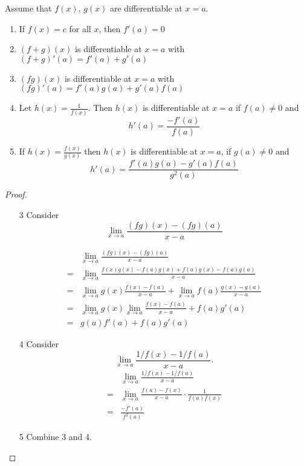 
\begin{thm}
Assume that $f(x)$, $g(x)$ are differentiable at $x=a$.
\begin{enumerate}
\item If $f(x) = c$ for all $x$, then $f'(a) = 0$
\item $(f+g)(x)$ is differentiable at $x=a$ with $(f+g)'(a) = f'(a) + g'(a)$
\item $(fg)(x)$ is differentiable at $x=a$ with $(fg)'(a) = f'(a)g(a) + g'(a)f(a)$
\item Let $h(x)= \frac{1}{f(x)}$. Then $h(x)$ is differentiable at $x = a$ if $f(a)\neq 0$ and \[h'(a) = \frac{-f'(a)}{f(a)}\]
\item If $h(x)=\frac{f(x)}{g(x)}$ then $h(x)$ is differentiable at $x=a$, if $g(a)\neq 0$ and \[h'(a) = \frac{f'(a)g(a)-g'(a)f(a)}{g^2(a)}\]
\end{enumerate}
\end{thm}

\begin{proof} \leavevmode

\begin{enumerate}
\item[3]
Consider \[\lim_{x\to a} \frac{(fg)(x) - (fg)(a)}{x-a}\]

\begin{align*}
   &  \lim_{x\to a} \frac{(fg)(x) - (fg)(a)}{x-a}\\
   = & \lim_{x\to a} \frac{f(x)g(x) - f(a)g(x) + f(a)g(x) - f(a)g(a)}{x-a}\\
   = & \lim_{x\to a} g(x)\frac{f(x) - f(a)}{x-a} + \lim_{x\to a} f(a) \frac{g(x) - g(a)}{x-a} \\
   = & \lim_{x\to a} g(x) \lim_{x\to a }\frac{f(x) - f(a)}{ x-a} + f(a)g'(a) \\
   = & g(a)f'(a) + f(a)g'(a)
\end{align*}

\item[4]
Consider \[\lim_{x\to a} \frac{1/f(x) - 1/f(a)}{x-a}.\]
\begin{align*}
    & \lim_{x\to a} \frac{1/f(x) - 1/f(a)}{x-a}\\
    = & \lim_{x\to a} \frac{f(a) - f(x)}{x-a}\cdot \frac{1}{f(a)f(x)}\\
    = & \frac{-f'(a)}{f^2(a)}
\end{align*}

\item[5] Combine 3 and 4.
\end{enumerate}
\end{proof}

